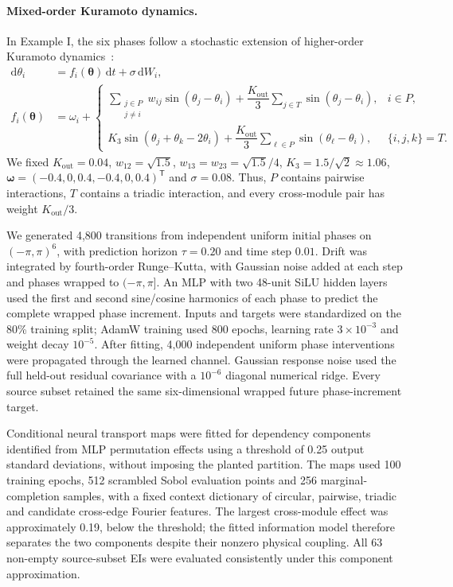 \documentclass[fleqn,10pt]{wlscirep}
\begin{document}
\paragraph{Mixed-order Kuramoto dynamics.}
In Example I, the six phases follow a stochastic extension of higher-order Kuramoto dynamics~\cite{Lucas2020Multiorder,Tang2022Optimizing}:
\begingroup
\begin{equation}
\begin{aligned}
\mathrm d\theta_i&=f_i(\boldsymbol{\theta})\,\mathrm dt+\sigma\,\mathrm dW_i,\\
f_i(\boldsymbol{\theta})&=\omega_i+
\begin{cases}
\displaystyle\sum_{\substack{j\in P\\j\ne i}}w_{ij}\sin(\theta_j-\theta_i)
+\dfrac{K_{\mathrm{out}}}{3}\displaystyle\sum_{j\in T}\sin(\theta_j-\theta_i),&i\in P,\\[6pt]
K_3\sin(\theta_j+\theta_k-2\theta_i)
+\dfrac{K_{\mathrm{out}}}{3}\displaystyle\sum_{\ell\in P}\sin(\theta_\ell-\theta_i),&\{i,j,k\}=T.
\end{cases}
\end{aligned}
\label{eq:six_node_kuramoto_fixed}
\end{equation}
\endgroup
We fixed $K_{\mathrm{out}}=0.04$, $w_{12}=\sqrt{1.5}$, $w_{13}=w_{23}=\sqrt{1.5}/4$, $K_3=1.5/\sqrt{2}\approx1.06$, $\boldsymbol{\omega}=(-0.4,0,0.4,-0.4,0,0.4)^{\mathsf T}$ and $\sigma=0.08$. Thus, $P$ contains pairwise interactions, $T$ contains a triadic interaction, and every cross-module pair has weight $K_{\mathrm{out}}/3$.

We generated 4,800 transitions from independent uniform initial phases on $(-\pi,\pi)^6$, with prediction horizon $\tau=0.20$ and time step $0.01$. Drift was integrated by fourth-order Runge--Kutta, with Gaussian noise added at each step and phases wrapped to $(-\pi,\pi]$. An MLP with two 48-unit SiLU hidden layers used the first and second sine/cosine harmonics of each phase to predict the complete wrapped phase increment. Inputs and targets were standardized on the 80\% training split; AdamW training used 800 epochs, learning rate $3\times10^{-3}$ and weight decay $10^{-5}$. After fitting, 4,000 independent uniform phase interventions were propagated through the learned channel. Gaussian response noise used the full held-out residual covariance with a $10^{-6}$ diagonal numerical ridge. Every source subset retained the same six-dimensional wrapped future phase-increment target.

Conditional neural transport maps were fitted for dependency components identified from MLP permutation effects using a threshold of 0.25 output standard deviations, without imposing the planted partition. The maps used 100 training epochs, 512 scrambled Sobol evaluation points and 256 marginal-completion samples, with a fixed context dictionary of circular, pairwise, triadic and candidate cross-edge Fourier features. The largest cross-module effect was approximately 0.19, below the threshold; the fitted information model therefore separates the two components despite their nonzero physical coupling. All 63 non-empty source-subset EIs were evaluated consistently under this component approximation.
\end{document}
